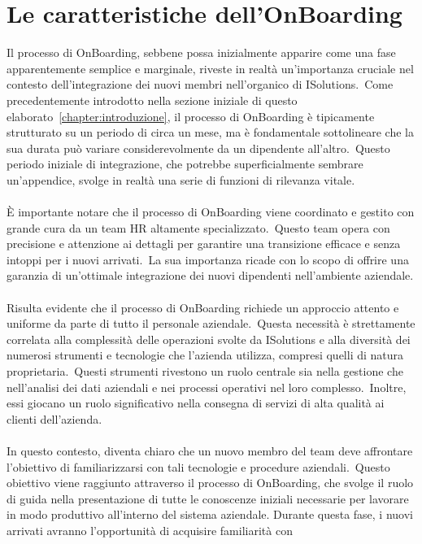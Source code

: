\chapter{Le caratteristiche dell'OnBoarding}\label{chapter:caratteristiche_onboarding}
Il processo di OnBoarding, sebbene possa inizialmente apparire come una fase apparentemente semplice e marginale, 
riveste in realtà un'importanza cruciale nel contesto dell'integrazione dei nuovi membri nell'organico di ISolutions.\
Come precedentemente introdotto nella sezione iniziale di questo elaborato~\ref{chapter:introduzione}, %
il processo di OnBoarding è tipicamente strutturato su un periodo di circa un mese, ma è fondamentale sottolineare che 
la sua durata può variare considerevolmente da un dipendente all'altro.\ Questo periodo iniziale di integrazione, 
che potrebbe superficialmente sembrare un'appendice, svolge in realtà una serie di funzioni di rilevanza vitale.
\\ \\
È importante notare che il processo di OnBoarding viene coordinato e gestito con grande cura da un team HR altamente specializzato.\ 
Questo team opera con precisione e attenzione ai dettagli per garantire una transizione efficace e senza intoppi per i nuovi arrivati.\ 
La sua importanza ricade con lo scopo di offrire una garanzia di un'ottimale integrazione dei nuovi dipendenti nell'ambiente aziendale.
\\ \\
Risulta evidente che il processo di OnBoarding richiede un approccio attento e uniforme da parte di tutto il personale aziendale.\ 
Questa necessità è strettamente correlata alla complessità delle operazioni svolte da ISolutions e alla diversità dei numerosi 
strumenti e tecnologie che l'azienda utilizza, compresi quelli di natura proprietaria.\ Questi strumenti rivestono un ruolo 
centrale sia nella gestione che nell'analisi dei dati aziendali e nei processi operativi nel loro complesso.\ 
Inoltre, essi giocano un ruolo significativo nella consegna di servizi di alta qualità ai clienti dell'azienda.
\\ \\
In questo contesto, diventa chiaro che un nuovo membro del team deve affrontare l'obiettivo di familiarizzarsi 
con tali tecnologie e procedure aziendali.\ Questo obiettivo viene raggiunto attraverso il processo di OnBoarding, 
che svolge il ruolo di guida nella presentazione di tutte le conoscenze iniziali necessarie per lavorare in modo produttivo 
all'interno del sistema aziendale. Durante questa fase, i nuovi arrivati avranno l'opportunità di acquisire familiarità con 

